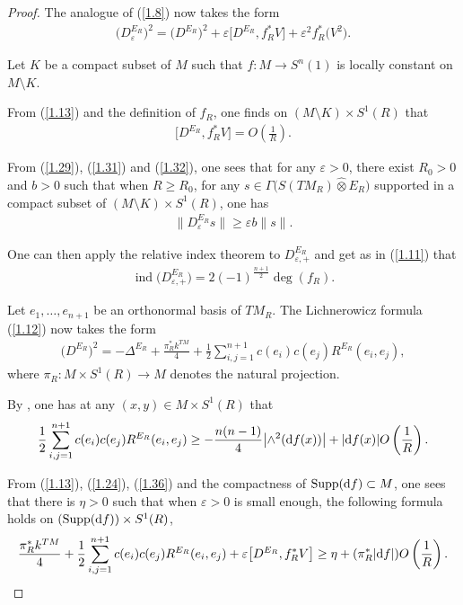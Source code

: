 \documentclass[10pt,a4paper]{amsart}
\numberwithin{equation}{section}
\theoremstyle{definition}
\begin{document}
\begin{proof}
The analogue of (\ref{1.8}) now takes the form
\begin{gather}\label{1.31}
\big(D^{E_R}_\varepsilon\big)^2 =\big(D^{E_R}\big)^2
+\varepsilon \big[D^{E_R},f_R^*V\big]+\varepsilon^2 f_R^*\big(V^2\big).
\end{gather}

Let $K$ be a compact subset of $M$ such that $f\colon M\rightarrow S^n(1)$ is locally constant on $M\setminus K$.

From (\ref{1.13}) and the definition of $f_R$, one finds on $ (M\setminus K)\times S^1(R)$ that
\begin{gather}\label{1.32}
\big[D^{E_R},f_R^*V\big] = O\left(\frac{1}{R}\right).
\end{gather}

From (\ref{1.29}), (\ref{1.31}) and (\ref{1.32}), one sees that for any $\varepsilon>0$, there exist $R_0>0$ and \mbox{$b>0$} such that when $R\geq R_0$, for any $s\in \Gamma\big(S(TM_R)\widehat\otimes E_R\big)$ supported in a compact subset of $ (M\setminus K)\times S^1(R)$, one has
\begin{gather}\label{1.33}
\big\|D^{E_R}_\varepsilon s\big\| \geq \varepsilon b \|s\|.
\end{gather}

One can then apply the relative index theorem \cite{GL83} to $D^{E_R}_{\varepsilon,+}$ and get as in (\ref{1.11}) that
\begin{gather}\label{1.34}
\operatorname{ind}\big(D^{E_R}_{\varepsilon,+}\big) = 2(-1)^{\frac{n+1}{2}}\deg (f_R ) .
\end{gather}

Let $e_1, \dots, e_{n+1}$ be an orthonormal basis of $TM_R$. The Lichnerowicz formula (\ref{1.12}) now takes the form
\begin{gather}\label{1.35}
\big(D^{E_R}\big)^2=-\Delta^{E_R}+\frac{\pi_R^*k^{TM}}{4}+\frac{1}{2}\sum_{i, j=1}^{n+1}
c (e_i )c (e_j )R^{E_R} (e_i,e_j ) ,
\end{gather}
where $\pi_R\colon M\times S^1(R)\rightarrow M$ denotes the natural projection.

By \cite[p.~68]{L98}, one has at any $(x,y)\in M\times S^1(R)$ that
\begin{gather}\label{1.36}
 \frac{1}{2}\sum_{i, j=1}^{n+1}
c (e_i )c (e_j )R^{E_R} (e_i,e_j ) \geq -\frac{n(n-1)}{4}\big|{\wedge}^2({\rm d}f(x))\big| + |{\rm d}f(x)| O\left(\frac{1}{R}\right).
\end{gather}

From (\ref{1.13}), (\ref{1.24}), (\ref{1.36}) and the compactness of $\operatorname{Supp}({\rm d}f)\subset M$, one sees that there is $\eta>0$ such that when $\varepsilon>0$ is small enough, the following formula holds on $(\operatorname{Supp}({\rm d}f))\times S^1(R)$,
\begin{gather}\label{1.37}
 \frac{\pi_R^*k^{TM}}{4}+\frac{1}{2}\sum_{i, j=1}^{n+1}
c(e_i)c(e_j)R^{E_R}(e_i,e_j) + \varepsilon \big[D^{E_R},f_R^*V\big]
\geq \eta+ (\pi_R^* |{\rm d}f| )O\left(\frac{1}{R}\right).
\end{gather}


\end{proof}
\end{document}
